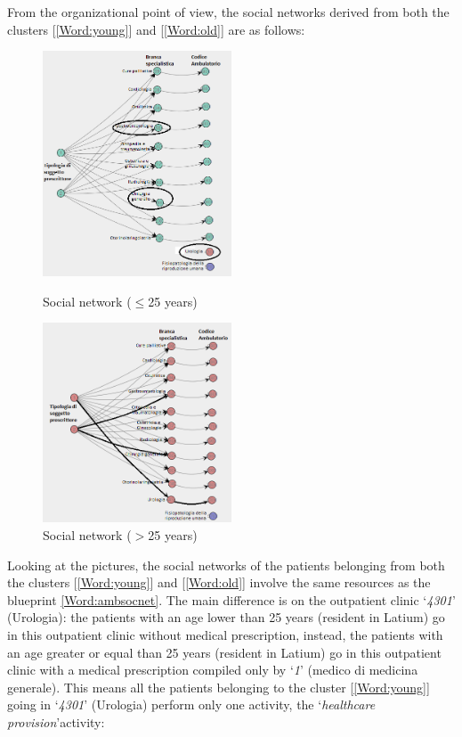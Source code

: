 \clearpage
\noindent
From the organizational point of view, the social networks derived from both the clusters [\ref{Word:young}] and [\ref{Word:old}] are as follows:
\begin{figure} [htbp]
\includegraphics[width=0.5\textwidth]{AmbulatoriSocialNetworkYoungs}
\caption{Social network ($\leq$25 years)}
\includegraphics[width=0.5\textwidth]{AmbulatoriSocialNetworkOlds}
\caption{Social network ($>$25 years)}
\end{figure} \newline
Looking at the pictures, the social networks of the patients belonging from both the clusters [\ref{Word:young}] and [\ref{Word:old}] involve the same resources as the blueprint \ref{Word:ambsocnet}. The main difference is on the outpatient clinic `\textit{4301}' (Urologia): the patients with an age lower than 25 years (resident in Latium) go in this outpatient clinic without medical prescription, instead, the patients with an age greater or equal than 25 years (resident in Latium) go in this outpatient clinic with a medical prescription compiled only by `\textit{1}' (medico di medicina generale). This means all the patients belonging to the cluster [\ref{Word:young}] going in `\textit{4301}' (Urologia) perform only one activity, the `\textit{healthcare provision}'activity:
